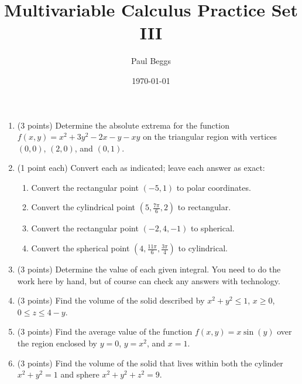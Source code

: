 \documentclass[11pt]{article}
\title{Multivariable Calculus Practice Set III}
\author{Paul Beggs}
\date{\today}
\newenvironment{solution}
  {\textit{Solution.}}
\newcommand{\sol}[1]{
    \begin{customframedproof}[linecolor=orangehdx!75,]
        \begin{solution}
        #1
        \end{solution}
    \end{customframedproof}
}
\begin{document}
\maketitle

\begin{enumerate}
    \item (3 points) Determine the absolute extrema for the function \(f(x,y) = x^{2} + 3y^{2} - 2x - y - xy\) on the triangular region with vertices \((0,0)\), \((2,0)\), and \((0,1)\). \\
    \item (1 point each) Convert each as indicated; leave each answer as exact:
    \begin{enumerate}
        \item Convert the rectangular point \((-5,1)\) to polar coordinates.
        \item Convert the cylindrical point \((5, \frac{7\pi}{6}, 2)\) to rectangular.
        \item Convert the rectangular point \((-2,4,-1)\) to spherical.
        \item Convert the spherical point \((4, \frac{11\pi}{6}, \frac{3\pi}{4})\) to cylindrical.
    \end{enumerate}
    \item (3 points) Determine the value of each given integral. You need to do the work here by hand, but of course can check any answers with technology.
    \item (3 points) Find the volume of the solid described by \(x^{2} + y^{2} \leq 1\), \(x \geq 0\), \(0 \leq z \leq 4 - y\).
    \item (3 points) Find the average value of the function \(f(x,y) = x\sin(y)\) over the region enclosed by \(y = 0\), \(y = x^{2}\), and \(x = 1\).
    \item (3 points) Find the volume of the solid that lives within both the cylinder \(x^{2} + y^{2} = 1\) and sphere \(x^{2} + y^{2} + z^{2} = 9\). \\
\end{enumerate}
\end{document}

